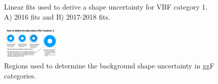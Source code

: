 \clearpage
\begin{figure}[ht!]
\centering
\captionsetup[subfigure]{justification=centering}
\caption[Linear fits used to derive a shape uncertainty for VBF category 1]{Linear fits used to derive a shape uncertainty for VBF category 1. A) 2016 fits and B) 2017-2018 fits.}
\label{fig:syst:VBFfits}
\end{figure}
\begin{figure}[ht!]
\centering
\includegraphics[width=0.25\textwidth,page=1]{Figures/Modeling/background/sketches/bkg_shape_unc_regions.pdf}
\caption[Regions used to determine the background shape uncertainty in ggF categories]{Regions used to determine the background shape uncertainty in ggF categories.}
\label{fig:syst:bkgshaperegions}
\end{figure}

\clearpage

